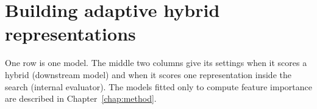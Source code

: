 \section{Building adaptive hybrid representations}\label{app:add:method}\label{app:searchspace}

\label{app:add:model_settings}
One row is one model. The middle two columns give its settings when it scores a hybrid (downstream model) and when it scores one representation inside the search (internal evaluator). The models fitted only to compute feature importance are described in Chapter~\ref{chap:method}.


